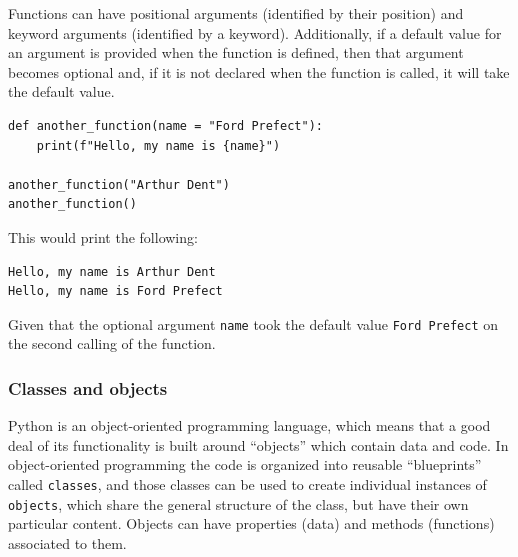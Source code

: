 \documentclass[a4paper,12pt]{article}
\begin{document}
Functions can have positional arguments (identified by their position) and keyword arguments (identified by a keyword). Additionally, if a default value for an argument is provided when the function is defined, then that argument becomes optional and, if it is not declared when the function is called, it will take the default value.

\begin{tcolorbox}[
    enhanced,
    attach boxed title to top left={xshift=6mm,yshift=-3mm},
    colback=lightgreen!20,
    colframe=lightgreen,
    colbacktitle=lightgreen,
    title=Python,
    fonttitle=\bfseries\color{black},
    boxed title style={size=small,colframe=lightgreen,sharp corners},
    sharp corners,
    ]
    \begin{verbatim}
def another_function(name = "Ford Prefect"):
    print(f"Hello, my name is {name}")

another_function("Arthur Dent")
another_function()
    \end{verbatim}
\end{tcolorbox}

This would print the following:

\begin{tcolorbox}[
    enhanced,
    attach boxed title to top left={xshift=6mm,yshift=-3mm},
    colback=lightgray!20,
    colframe=lightgray,
    colbacktitle=lightgray,
    title=Output,
    fonttitle=\bfseries\color{black},
    boxed title style={size=small,colframe=lightgray,sharp corners},
    sharp corners,
    ]
    \begin{verbatim}
Hello, my name is Arthur Dent
Hello, my name is Ford Prefect
    \end{verbatim}
\end{tcolorbox}
Given that the optional argument \verb|name| took the default value \verb|Ford Prefect| on the second calling of the function.

\subsubsection{Classes and objects}

Python is an object-oriented programming language, which means that a good deal of its functionality is built around ``objects'' which contain data and code. In object-oriented programming the code is organized into reusable ``blueprints'' called \verb|classes|, and those classes can be used to create individual instances of \verb|objects|, which share the general structure of the class, but have their own particular content. Objects can have properties (data) and methods (functions) associated to them.
\end{document}
